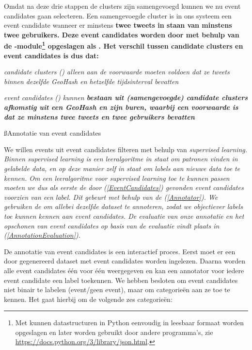 {{Omdat na deze drie stappen de clusters zijn samengevoegd kunnen we nu event 
candidates gaan selecteren. Een samengevoegde cluster is in ons systeem een 
event candidate wanneer er minstens \bf{twee tweets} in staan van minstens \bf{twee 
gebruikers}. Deze event candidates worden door  met behulp van de 
-module\footnote{Met  kunnen datastructuren in Python eenvoudig 
in leesbaar formaat worden opgeslagen en later worden gebruikt door andere
programma's, zie \url{https://docs.python.org/3/library/json.html}.} opgeslagen
als .
\vl
Het verschil tussen candidate clusters en event candidates is dus dat:

\begin{bullets}
\item \it{candidate clusters} () alleen aan de voorwaarde moeten voldoen 
dat ze tweets binnen dezelfde GeoHash en hetzelfde tijdsinterval bevatten
\item \it{event candidates} () kunnen \bf{bestaan} uit (samengevoegde) candidate 
clusters afkomstig uit een GeoHash \bf{en} zijn buren, waarbij een voorwaarde is dat 
ze minstens twee tweets en twee gebruikers bevatten
\end{bullets}

\ss{Annotatie van event candidates}\label{annotatie}

We willen events uit event candidates filteren met behulp van \it{supervised 
learning}. Binnen supervised learning is een leeralgoritme in staat om patronen 
vinden in \it{gelabelde} data, en op deze manier zelf in staat om labels aan nieuwe 
data toe te kennen. Om een leeralgoritme voor supervised learning toe te kunnen 
passen moeten we dus als eerste de door  (\ref{EventCandidates}) gevonden event 
candidates voorzien van een label. Dit gebeurt met behulp van de 
(\ref{Annotator}). We gebruiken de  om allebei dezelfde dataset te annoteren, 
zodat we objectiever labels toe kunnen kennen aan event candidates. De evaluatie 
van onze annotatie en het opschonen van event candidates op basis van de 
evaluatie vindt plaats in  (\ref{AnnotationEvaluation}).

\label{Annotator}

De annotatie van event candidates is een interactief proces. Eerst moet er een 
door  gegenereerd dataset met event candidates worden ingelezen. 
Daarna worden alle event candidates één voor één weergegeven en kan een 
annotator voor iedere event candidate een label toekennen. We hebben besloten om 
event candidates niet binair te labelen (event/geen event), maar om categorieën 
aan ze toe te kennen. Het gaat hierbij om de volgende zes categorieën:

}}
